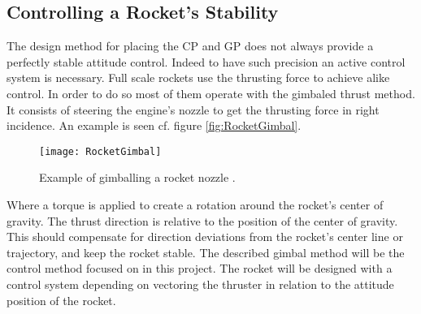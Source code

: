 \subsection{Controlling a Rocket's Stability}
The design method for placing the CP and GP does not always provide a perfectly stable attitude control. Indeed to have such precision an active control system is necessary. Full scale rockets use the thrusting force to achieve alike control. In order to do so most of them operate with the gimbaled thrust method. It consists of steering the engine's nozzle to get the thrusting force in right incidence. An example is seen cf. figure \autoref{fig:RocketGimbal}. 
\begin{figure} [htbp]
	\centering
	\texttt{[image: RocketGimbal]}
	\caption{Example of gimballing a rocket nozzle \cite{web:rocketnasa}.}
	\label{fig:RocketGimbal}
\end{figure}

Where a torque is applied to create a rotation around the rocket's center of gravity. The thrust direction is relative to the position of the center of gravity.  This should compensate for direction deviations from the rocket's center line or trajectory, and keep the rocket stable. The described gimbal method will be the control method focused on in this project. The rocket will be designed with a control system depending on vectoring the thruster in relation to the attitude position of the rocket. 

